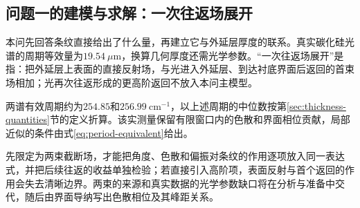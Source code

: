\subsection{问题一的建模与求解：一次往返场展开}

本问先回答条纹直接给出了什么量，再建立它与外延层厚度的联系。真实碳化硅光谱的周期等效量为$19.54\ \mu\mathrm{m}$，换算几何厚度还需光学参数。“一次往返场展开”是指：把外延层上表面的直接反射场，与光进入外延层、到达衬底界面后返回的首束场相加；光再次往返形成的更高阶返回不放入本问主模型。

两谱有效周期约为$254.85$和$256.99\ \mathrm{cm}^{-1}$，以上述周期的中位数按第\ref{sec:thickness-quantities}节的定义折算。该实测量保留有限窗口内的色散和界面相位贡献，局部近似的条件由式\eqref{eq:period-equivalent}给出。

先限定为两束截断场，才能把角度、色散和偏振对条纹的作用逐项放入同一表达式，并把后续往返的收益单独检验；若直接引入高阶项，表面反射与首个返回的作用会失去清晰边界。两束的来源和真实数据的光学参数缺口将在分析与准备中交代，随后由界面导纳写出色散相位及其峰距关系。
